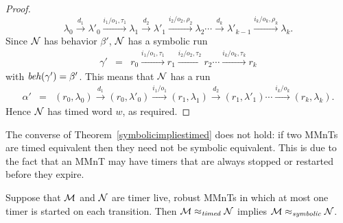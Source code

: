 \begin{proof}
\[\lambda_0 \xrightarrow{d_1} \lambda'_0 \xrightarrow{i_1/o_1, \tau_1} \lambda_1 \xrightarrow{d_2} \lambda'_1 \xrightarrow{i_2/o_2, \rho_2} \lambda_2 \cdots
\xrightarrow{d_k} \lambda'_{k-1} \xrightarrow{i_k/o_k, \rho_k} \lambda_{k}.
\]
Since ${\cal N}$ has behavior $\beta'$, ${\cal N}$ has a symbolic run
\begin{eqnarray*}
\gamma' & = & r_0 \xrightarrow{i_1/o_1, \tau_1} r_1  \xrightarrow{i_2/o_2, \tau_2} r_2 \cdots \xrightarrow{i_k/o_k, \tau_k} r_k
\end{eqnarray*}
with $\mathit{beh}(\gamma') = \beta'$.
This means that ${\cal N}$ has a run
\begin{eqnarray*}
\alpha' & = & (r_0, \lambda_0) \xrightarrow{d_1} (r_0, \lambda'_0) \xrightarrow{i_1/o_1} (r_1, \lambda_1) \xrightarrow{d_2} (r_1, \lambda'_1)  \cdots
 \xrightarrow{i_k/o_k} (r_k, \lambda_k).
\end{eqnarray*}
Hence ${\cal N}$ has timed word $w$, as required.
\end{proof}

The converse of Theorem~\ref{symbolicimpliestimed} does not hold: if two MMnTs are timed equivalent then they need not
be symbolic equivalent. This is due to the fact that an MMnT may have timers that are always stopped or restarted before
they expire.

\begin{theorem}
\label{timedimpliessymbolic}
Suppose that ${\cal M}$ and ${\cal N}$ are timer live, robust MMnTs in which at most one timer is started on each transition. Then
${\cal M} \approx_{\mathit{timed}} {\cal N}$
implies
${\cal M} \approx_{\mathit{symbolic}} {\cal N}$.
\end{theorem}


